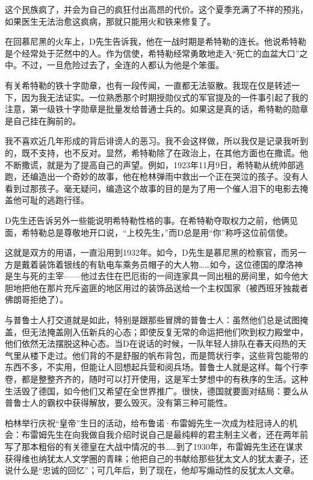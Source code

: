 \documentclass[UTF8]{ctexart}
\begin{document}
这个民族疯了，并会为自己的疯狂付出高昂的代价。这个夏季充满了不祥的预兆，如果医生无法治愈这疯病，那就只能用火和铁来修复了。

在回慕尼黑的火车上，D先生告诉我，他在一战时期是希特勒的连长。他说希特勒是个经常处于茫然中的人。作为信使，希特勒经常勇敢地走入“死亡的血盆大口”之中。不过，一旦危险过去了，全连的人都认为他是个笨蛋。

有关希特勒的铁十字勋章，也有一段传闻，一直都无法驱散。我现在仅是转述一下，因为我无法证实。一位熟悉那个时期授勋仪式的军官提及的一件事引起了我的注意，第一级铁十字勋章是批量发给普通士兵的。如果这是真的话，希特勒的勋章是自己挂在胸前的。

我不喜欢近几年形成的背后诽谤人的恶习。我不会这样做，所以我仅是记录我听到的，既不支持，也不反对。显然，希特勒除了在政治上，在其他方面也在撒谎。他不断撒谎，就是为了提高自己的声望。例如，1923年11月9日，希特勒从统帅部逃跑，还编造出一个奇妙的故事，他在枪林弹雨中救出一个正在哭泣的孩子。没有人看到过那孩子。毫无疑问，编造这个故事的目的是为了用一个催人泪下的电影去掩盖他可耻的逃跑行径。

D先生还告诉另外一些能说明希特勒性格的事。在希特勒夺取权力之前，他俩见面，希特勒总是尊敬地开口说，“上校先生，”而D总是用“你”称呼这位前信使。

这就是双方的用语，一直沿用到1932年。如今，D先生是慕尼黑的检察官，而另一方是戴着装饰着银线的有轨电车乘务员帽子的大人物……如今，这位德国的摩洛神是生与死的主宰——他过去住在巴厄街的一间连家具一同出租的房间里，如今他大胆地把他在那片充斥盗匪的地区用过的装饰品送给一个主权国家（被西班牙独裁者佛朗哥拒绝了）。

与普鲁士人打交道就是如此，特别是跟那些冒牌的普鲁士人：虽然他们总是试图掩盖，但无法掩盖刚入伍新兵的心态；即使反复无常的命运把他们吹到权力殿堂中，他们依然无法摆脱这种心态。当D在说话的时候，一队年轻人排队在春天闷热的天气里从楼下走过。他们背的不是舒服的帆布背包，而是筒状行李，这些背包能带的东西不多，不实用，但能让人回想起兵营和阅兵场。普鲁士人就是这样。每个行李卷，都是整整齐齐的，随时可以打开使用，这是军士梦想中的有秩序的生活。这种生活毁了德国，如今他们又希望在全世界推广。很快，德国就要面对结局：要么从普鲁士人的霸权中获得解放，要么毁灭。没有第三种可能性。

柏林举行庆祝“皇帝”生日的活动，给布鲁诺·布雷姆先生一次成为桂冠诗人的机会：布雷姆先生在向我做自我介绍时说自己是最纯粹的君主制主义者，还在两年前写了那本粗俗的有关德皇在大战中情况的书……到了1930年，布雷姆先生还在谋求获得维也纳犹太人文学圈的青睐；他把自己的书献给那些犹太文人的犹太妻子，还说什么是“忠诚的回忆”；可几年后，到了现在，他却写煽动性的反犹太人文章。
\end{document}
